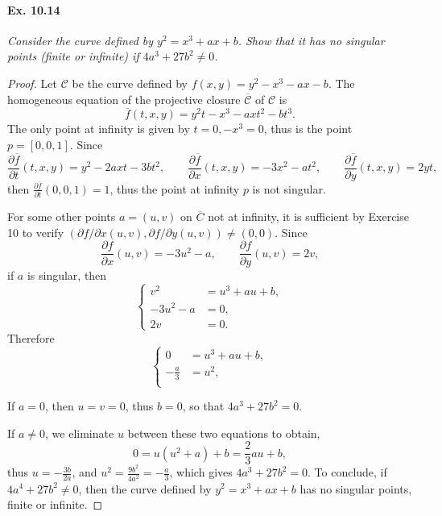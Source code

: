 \documentclass[11pt,a4paper]{article}
\begin{document}
\paragraph{Ex. 10.14} {\it Consider the curve defined by $y^2 = x^3 + ax +b$. Show that it has no singular points (finite or infinite) if $4a^3 + 27 b^2 \ne 0$.
}

\begin{proof} Let $\mathscr{C}$ be  the curve defined by $f(x,y) = y^2 - x^3  - ax - b$. The homogeneous equation of the projective closure $\overline{\mathscr{C}}$ of $\mathscr{C}$ is
$$\overline{f}(t,x,y) = y^2 t - x^3 -a xt^2 - bt^3.$$
The only point at infinity is given by $t = 0, -x^3 = 0$, thus is the point $p = [0,0,1]$.
Since
$$\frac{\partial \overline{f}}{\partial t} (t,x,y)= y^2 -2axt -3bt^2, \qquad \frac{\partial \overline{f}}{\partial x}(t,x,y) = -3x^2 -at^2,\qquad  \frac{\partial \overline{f}}{\partial y}(t,x,y) = 2y t,$$
then $\frac{\partial \overline{f}}{\partial t} (0,0,1) = 1$, thus the point at infinity $p$ is not singular.

For some other points $a = (u,v)$ on $\overline{C}$ not at infinity, it is sufficient by Exercise 10 to verify $(\partial f/\partial x (u,v), \partial f/\partial y (u,v)) \ne (0,0)$. Since
$$\frac{\partial f}{\partial x}(u,v) = -3u^2 -a,\qquad \frac{\partial f}{\partial y}(u,v) = 2v,$$
if $a$ is singular, then
$$
\left \{
\begin{array}{ll}
v^2 &= u^3  + au +b,\\
-3u^2 - a &= 0,\\
2v &= 0.
\end{array}
\right.
$$
Therefore
$$
\left \{
\begin{array}{ll}
0&= u^3  + au +b,\\
-\frac{a}{3}&= u^2,\\
\end{array}
\right.
$$

If $a = 0$, then $u=v=0$, thus $b=0$, so that $4a^3 + 27b^2 = 0$.

If $a \ne 0$,  we eliminate $u$ between these two equations to obtain, 
$$0 = u(u^2 + a) + b = \frac{2}{3}a u +b,$$
thus
$u = -\frac{3b}{2a}$, and $u^2 = \frac{9b^2}{4a^2} = -\frac{a}{3}$, which gives $4a^3 + 27b^2 = 0$.
To conclude, if $4a^4 + 27b^2 \ne 0$, then the curve defined by $y^2 = x^3 + ax +b$ has no singular points, finite or infinite.
\end{proof}
\end{document}
